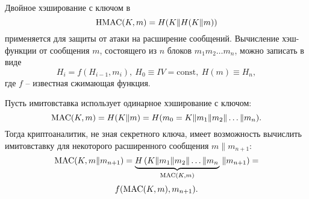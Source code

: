 Двойное хэширование с ключом в
    \[ \textrm{HMAC}(K, m) = H(K \| H(K \| m)) \]
применяется для защиты от атаки на расширение сообщений. Вычисление хэш-функции от сообщения $m$, состоящего из $n$ блоков $m_1 m_2 \dots m_n$, можно записать в виде
    \[ H_i = f(H_{i-1}, m_i), ~ H_0 \equiv IV = \textrm{const}, ~ H(m) \equiv H_n, \]
где $f$ -- известная сжимающая функция.

Пусть имитовставка использует одинарное хэширование с ключом:
    \[ \textrm{MAC}(K, m) = H(K \| m) = H (m_0 = K \| m_1 \| m_2 \| \dots \| m_n). \]
Тогда криптоаналитик, не зная секретного ключа, имеет возможность вычислить имитовставку для некоторого расширенного сообщения $m \| m_{n+1}$:
\[
    \textrm{MAC}(K, m \| m_{n+1}) = \underbrace{H \left( K \| m_1 \| m_2 \| \dots \| m_n \right.}_{\textrm{MAC}(K, m)} \left. \| m_{n+1} \right) =
\] \[
    f(\textrm{MAC}(K, m), m_{n+1}).
\]
